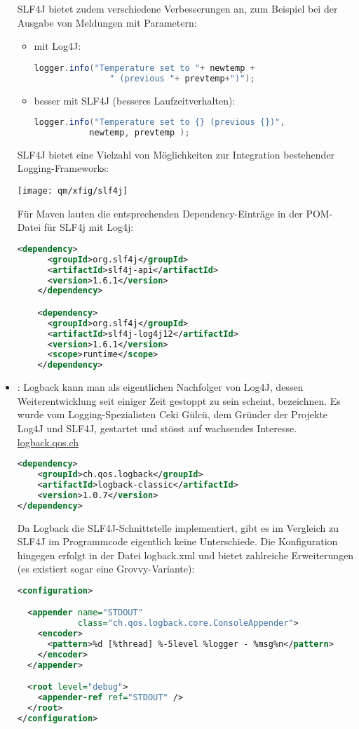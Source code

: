 \begin{itemize}
SLF4J bietet zudem verschiedene Verbesserungen an, zum Beispiel
bei der Ausgabe von Meldungen mit Parametern:
\begin{itemize}
\item mit Log4J:
  \begin{lstlisting}[language=java]
logger.info("Temperature set to "+ newtemp +
               " (previous "+ prevtemp+")");
  \end{lstlisting}
\item besser mit SLF4J (besseres Laufzeitverhalten):
  \begin{lstlisting}[language=java]
logger.info("Temperature set to {} (previous {})",
           newtemp, prevtemp );
         \end{lstlisting}
       \end{itemize}
\newslide
SLF4J bietet eine Vielzahl von Möglichkeiten zur Integration bestehender
Logging-Frameworks:

\texttt{[image: qm/xfig/slf4j]}

\newslide
Für Maven lauten die entsprechenden Dependency-Einträge in der POM-Datei
für SLF4j mit Log4j:
\begin{lstlisting}[language=xml,
  morekeywords={dependency,groupId,artifactId,scope}]
    <dependency>
      <groupId>org.slf4j</groupId>
      <artifactId>slf4j-api</artifactId>
      <version>1.6.1</version>
    </dependency>

    <dependency>
      <groupId>org.slf4j</groupId>
      <artifactId>slf4j-log4j12</artifactId>
      <version>1.6.1</version>
      <scope>runtime</scope>
    </dependency>
\end{lstlisting}
\newslide
\item {}: Logback kann man als
  eigentlichen Nachfolger von Log4J, dessen Weiterentwicklung seit
  einiger Zeit gestoppt zu sein scheint, bezeichnen.
Es wurde vom Logging-Spezialisten Ceki Gülcü,
dem Gründer der Projekte Log4J und SLF4J, gestartet
und stösst auf wachsendes Interesse.
\href{http://logback.qos.ch}{logback.qos.ch}
\begin{lstlisting}[language=xml,morekeywords={dependency,groupId,artifactId}]
<dependency>
    <groupId>ch.qos.logback</groupId>
    <artifactId>logback-classic</artifactId>
    <version>1.0.7</version>
</dependency>
\end{lstlisting}
Da Logback die SLF4J-Schnittstelle implementiert,
gibt es im Vergleich zu SLF4J im Programmcode eigentlich keine
Unterschiede.
\newslide
 Die Konfiguration hingegen erfolgt in der Datei logback.xml und bietet
zahlreiche Erweiterungen (es existiert sogar eine Grovvy-Variante):
\begin{lstlisting}[language=xml,
  morekeywords={configuration,appender,encoder,pattern,root}]
<configuration>

  <appender name="STDOUT"
            class="ch.qos.logback.core.ConsoleAppender">
    <encoder>
      <pattern>%d [%thread] %-5level %logger - %msg%n</pattern>
    </encoder>
  </appender>

  <root level="debug">
    <appender-ref ref="STDOUT" />
  </root>
</configuration>


\end{lstlisting}
\end{itemize}
%
\newslide
